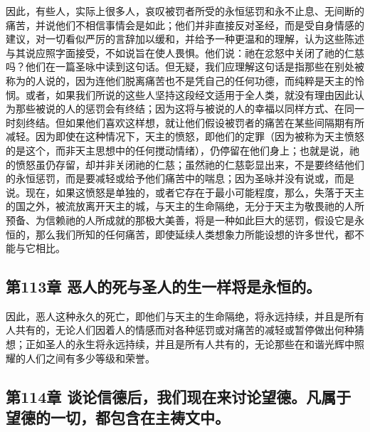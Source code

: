 因此，有些人，实际上很多人，哀叹被罚者所受的永恒惩罚和永不止息、无间断的痛苦，并说他们不相信事情会是如此；他们并非直接反对圣经，而是受自身情感的建议，对一切看似严厉的言辞加以缓和，并给予一种更温和的理解，认为这些陈述与其说应照字面接受，不如说旨在使人畏惧。他们说：祂在忿怒中关闭了祂的仁慈吗？他们在一篇圣咏中读到这句话。但无疑，我们应理解这句话是指那些在别处被称为的人说的，因为连他们脱离痛苦也不是凭自己的任何功德，而纯粹是天主的怜悯。或者，如果我们所说的这些人坚持这段经文适用于全人类，就没有理由因此认为那些被说的人的惩罚会有终结；因为这将与被说的人的幸福以同样方式、在同一时刻终结。但如果他们喜欢这样想，就让他们假设被罚者的痛苦在某些间隔期有所减轻。因为即使在这种情况下，天主的愤怒，即他们的定罪（因为被称为天主愤怒的是这个，而非天主思想中的任何搅动情绪），仍停留在他们身上；也就是说，祂的愤怒虽仍存留，却并非关闭祂的仁慈；虽然祂的仁慈彰显出来，不是要终结他们的永恒惩罚，而是要减轻或给予他们痛苦中的喘息；因为圣咏并没有说或，而是说。现在，如果这愤怒是单独的，或者它存在于最小可能程度，那么，失落于天主的国之外，被流放离开天主的城，与天主的生命隔绝，无分于天主为敬畏祂的人所预备、为信赖祂的人所成就的那极大美善，将是一种如此巨大的惩罚，假设它是永恒的，那么我们所知的任何痛苦，即使延续人类想象力所能设想的许多世代，都不能与它相比。\par


\subsection{第113章 恶人的死与圣人的生一样将是永恒的。}

因此，恶人这种永久的死亡，即他们与天主的生命隔绝，将永远持续，并且是所有人共有的，无论人们因着人的情感而对各种惩罚或对痛苦的减轻或暂停做出何种猜想；正如圣人的永生将永远持续，并且是所有人共有的，无论那些在和谐光辉中照耀的人们之间有多少等级和荣誉。\par



\subsection{第114章 谈论信德后，我们现在来讨论望德。凡属于望德的一切，都包含在主祷文中。}

